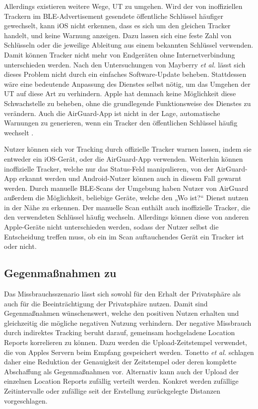 Allerdings existieren weitere Wege, \ac{UT} zu umgehen.
Wird der von inoffiziellen Trackern im \ac{BLE}-Advertisement gesendete öffentliche Schlüssel häufiger gewechselt, kann iOS nicht erkennen, dass es sich um den gleichen Tracker handelt, und keine Warnung anzeigen.
Dazu lassen sich eine feste Zahl von Schlüsseln oder die jeweilige Ableitung aus einem bekannten Schlüssel verwenden.
Damit können Tracker nicht mehr von Endgeräten ohne Internetverbindung unterschieden werden.
Nach den Untersuchungen von Mayberry \textit{et al.} \cite{Mayberry_Tracking} lässt sich dieses Problem nicht durch ein einfaches Software-Update beheben.
Stattdessen wäre eine bedeutende Anpassung des Dienstes selbst nötig, um das Umgehen der \ac{UT} auf diese Art zu verhindern.
Apple hat demnach keine Möglichkeit diese Schwachstelle zu beheben, ohne die grundlegende Funktionsweise des Dienstes zu verändern.
Auch die AirGuard-App ist nicht in der Lage, automatische Warnungen zu generieren, wenn ein Tracker den öffentlichen Schlüssel häufig wechselt \cite{Heinrich_AirGuard}.

Nutzer können sich vor Tracking durch offizielle Tracker warnen lassen, indem sie entweder ein iOS-Gerät, oder die AirGuard-App verwenden.
Weiterhin können inoffizielle Tracker, welche nur das Status-Feld manipulieren, von der AirGuard-App erkannt werden und Android-Nutzer können auch in diesem Fall gewarnt werden.
Durch manuelle \ac{BLE}-Scans der Umgebung haben Nutzer von AirGuard außerdem die Möglichkeit, beliebige Geräte, welche den „Wo ist?“ Dienst nutzen in der Nähe zu erkennen.
Der manuelle Scan enthält auch inoffizielle Tracker, die den verwendeten Schlüssel häufig wechseln.
Allerdings können diese von anderen Apple-Geräte nicht unterschieden werden, sodass der Nutzer selbst die Entscheidung treffen muss, ob ein im Scan auftauchendes Gerät ein Tracker ist oder nicht.

\subsection{Gegenmaßnahmen zu }

Das Missbrauchsszenario  lässt sich sowohl für den Erhalt der Privatsphäre als auch für die Beeinträchtigung der Privatsphäre nutzen.
Damit sind Gegenmaßnahmen wünschenswert, welche den positiven Nutzen erhalten und gleichzeitig die mögliche negativen Nutzung verhindern.
Der negative Missbrauch durch indirektes Tracking beruht darauf, gemeinsam hochgeladene Location Reports korrelieren zu können.
Dazu werden die Upload-Zeitstempel verwendet, die von Apples Servern beim Empfang gespeichert werden.
Tonetto \textit{et al.} \cite{Tonetto_FindMy} schlagen daher eine Reduktion der Genauigkeit der Zeitstempel oder deren komplette Abschaffung als Gegenmaßnahmen vor.
Alternativ kann auch der Upload der einzelnen Location Reports zufällig verteilt werden.
Konkret werden zufällige Zeitintervalle oder zufällige seit der Erstellung zurückgelegte Distanzen vorgeschlagen.

